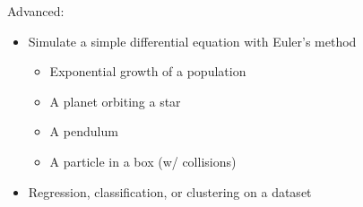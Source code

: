 \documentclass[12pt]{article}%
\begin{document}
\vspace{10pt}

\noindent Advanced:
\begin{itemize}
	\setlength\itemsep{-2pt}
	\item Simulate a simple differential equation with Euler's method
	\begin{itemize}
		\setlength\itemsep{-2pt}
		\item Exponential growth of a population
		\item A planet orbiting a star
		\item A pendulum
		\item A particle in a box (w/ collisions)
	\end{itemize}
	\item Regression, classification, or clustering on a dataset
\end{itemize}
\end{document}
